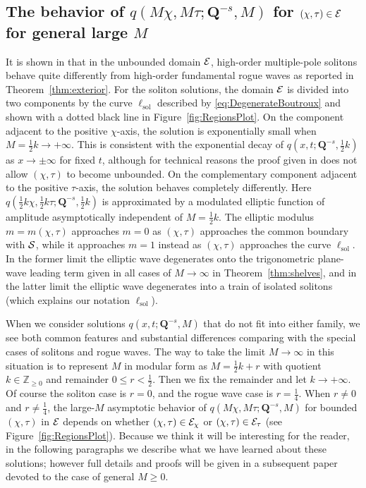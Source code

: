 \subsection{The behavior of $q(M\chi,M\tau;\mathbf{Q}^{-s},M)$ for $(\chi,\tau)\in\mathcal{E}$ for general large $M$}
\label{sec:general}
It is shown in \cite{BilmanBW19} that in the unbounded domain $\mathcal{E}$, high-order multiple-pole solitons behave quite differently from high-order fundamental rogue waves as reported in Theorem~\ref{thm:exterior}.  For the soliton solutions, the domain $\mathcal{E}$ is divided into two components by the curve $\ell_\mathrm{sol}$ described by \eqref{eq:DegenerateBoutroux} and shown with a dotted black line in Figure~\ref{fig:RegionsPlot}.  On the component adjacent to the positive $\chi$-axis, the solution is exponentially small when $M=\tfrac{1}{2}k\to+\infty$.  This is consistent with the exponential decay of $q(x,t;\mathbf{Q}^{-s},\tfrac{1}{2}k)$ as $x\to \pm\infty$ for fixed $t$, although for technical reasons the proof given in \cite{BilmanBW19} does not allow $(\chi,\tau)$ to become unbounded.  On the complementary component adjacent to the positive $\tau$-axis, the solution behaves completely differently.  Here $q(\tfrac{1}{2}k\chi,\tfrac{1}{2}k\tau;\mathbf{Q}^{-s},\tfrac{1}{2}k)$ is approximated by a modulated elliptic function of amplitude asymptotically independent of $M=\tfrac{1}{2}k$.  The elliptic modulus $m=m(\chi,\tau)$ approaches $m=0$ as $(\chi,\tau)$ approaches the common boundary with $\mathcal{S}$, while it approaches $m=1$ instead as $(\chi,\tau)$ approaches the curve $\ell_\mathrm{sol}$.  In the former limit the elliptic wave degenerates onto the trigonometric plane-wave leading term given in all cases of $M\to\infty$ in Theorem~\ref{thm:shelves}, and in the latter limit the elliptic wave degenerates into a train of isolated solitons (which explains our notation $\ell_\mathrm{sol}$).   

When we consider solutions $q(x,t;\mathbf{Q}^{-s},M)$ that do not fit into either family, we see both common features and substantial differences comparing with the special cases of solitons and rogue waves.  The way to take the limit $M\to\infty$ in this situation is to represent $M$ in modular form as $M=\tfrac{1}{2}k+r$ with quotient $k\in\mathbb{Z}_{\ge 0}$ and remainder $0\le r<\tfrac{1}{2}$.  Then we fix the remainder and let $k\to+\infty$.  Of course the soliton case is $r=0$, and the rogue wave case is $r=\tfrac{1}{4}$.  When $r\neq 0$ and $r\neq\tfrac{1}{4}$, the large-$M$ asymptotic behavior of $q(M\chi,M\tau;\mathbf{Q}^{-s},M)$ for bounded $(\chi,\tau)$ in $\mathcal{E}$ depends on whether $(\chi,\tau)\in\mathcal{E}_\chi$ or $(\chi,\tau)\in\mathcal{E}_\tau$ (see Figure~\ref{fig:RegionsPlot}).  Because we think it will be interesting for the reader, in the following paragraphs we describe what we have learned about these solutions; however full details and proofs will be given in a subsequent paper devoted to the case of general $M\ge 0$.

